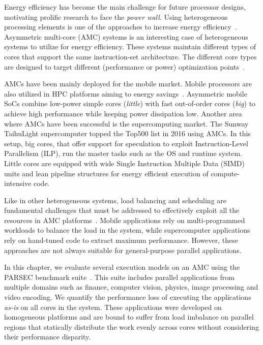Energy efficiency has become the main challenge for future processor designs, motivating prolific research to face the \emph{power wall}. 
Using heterogeneous processing elements is one of the approaches to increase energy efficiency~\cite{CompCores,hetServers}. 
Asymmetric multi-core (AMC) systems is an interesting case of heterogeneous systems to utilize for energy efficiency.
These systems maintain different types of cores that support the same instruction-set architecture. 
The different core types are designed to target different (performance or power) optimization points~\cite{Kumar:ISCA2004,Balakrishnan:ISCA2005,Pangaea}. 

AMCs have been mainly deployed for the mobile market. 
Mobile processors are also utilized in HPC platforms aiming to energy savings~\cite{ARMV8}.
Asymmetric mobile SoCs combine low-power simple cores (\emph{little}) with fast out-of-order cores (\emph{big}) to achieve high performance while keeping power dissipation low.
Another area where AMCs have been successful is the supercomputing market.
The Sunway TaihuLight supercomputer topped the Top500 list in 2016 using AMCs. 
In this setup, big cores, that offer support for speculation to exploit Instruction-Level Parallelism (ILP), run the master tasks such as the OS and runtime system.
Little cores are equipped with wide Single Instruction Multiple Data (SIMD) units and lean pipeline structures for energy efficient execution of compute-intensive code. 

Like in other heterogeneous systems, load balancing and scheduling are fundamental challenges that must be addressed to effectively exploit all the resources in AMC platforms~\cite{Suleman:APLOS2009,Fedorova2009,Greenhalgh2011,Joao:ASPLOS2012,Joao:ISCA2013,ARM4HPC_SC13}. 
Mobile applications rely on multi-programmed workloads to balance the load in the system, while supercomputer applications rely on hand-tuned code to extract maximum performance. 
However, these approaches are not always suitable for general-purpose parallel applications.

In this chapter, we evaluate several execution models on an AMC using the PARSEC benchmark suite~\cite{PARSEC3}. 
This suite includes parallel applications from multiple domains such as finance, computer vision, physics, image processing and video encoding. 
We quantify the performance loss of executing the applications \textit{as-is} on all cores in the system. 
These applications were developed on homogeneous platforms and are bound to suffer from load imbalance on parallel regions that statically distribute the work evenly across cores without considering their performance disparity.

